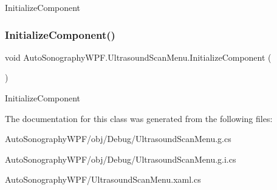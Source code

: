 Initialize\+Component 

\hypertarget{class_auto_sonography_w_p_f_1_1_ultrasound_scan_menu_a16a3c05a908d3edf244d0e5ec887519b}{}\label{class_auto_sonography_w_p_f_1_1_ultrasound_scan_menu_a16a3c05a908d3edf244d0e5ec887519b} 
\subsubsection{\texorpdfstring{Initialize\+Component()}{InitializeComponent()}\hspace{0.1cm}{\footnotesize\ttfamily [4/4]}}
{\footnotesize\ttfamily void Auto\+Sonography\+W\+P\+F.\+Ultrasound\+Scan\+Menu.\+Initialize\+Component (\begin{DoxyParamCaption}{ }\end{DoxyParamCaption})}



Initialize\+Component 



The documentation for this class was generated from the following files\+:\begin{DoxyCompactItemize}
\item 
Auto\+Sonography\+W\+P\+F/obj/\+Debug/Ultrasound\+Scan\+Menu.\+g.\+cs\item 
Auto\+Sonography\+W\+P\+F/obj/\+Debug/Ultrasound\+Scan\+Menu.\+g.\+i.\+cs\item 
Auto\+Sonography\+W\+P\+F/Ultrasound\+Scan\+Menu.\+xaml.\+cs\end{DoxyCompactItemize}
